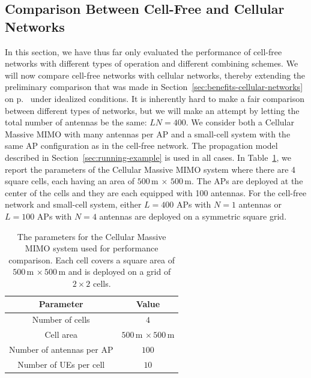 \enlargethispage{\baselineskip}

\subsection{Comparison Between Cell-Free and Cellular Networks}

In this section, we have thus far only evaluated the performance of cell-free networks with different types of operation and different combining schemes. We will now compare cell-free networks with cellular networks, thereby extending the preliminary comparison that was made in Section~\ref{sec:benefits-cellular-networks} on p.~\pageref{sec:benefits-cellular-networks} under idealized conditions. It is inherently hard to make a fair comparison between different types of networks, but we will make an attempt by letting the total number of antennas be the same: $LN=400$. We consider both a Cellular Massive MIMO with many antennas per AP and a small-cell system with the same AP configuration as in the cell-free network.
The propagation model described in Section~\ref{sec:running-example} is used in all cases. In Table~\ref{tab:system_parameters_running_example_cellular}, we report the parameters of the Cellular Massive MIMO system where there are 4 square cells, each having an area of $500$\,m $\times$ $500$\,m. The APs are deployed at the center of the cells and they are each equipped with 100 antennas. For the cell-free network and small-cell system, either $L=400$ APs with $N=1$ antennas or $L=100$ APs with $N=4$ antennas are deployed on a symmetric square grid.

\begin{table}[t]
	\renewcommand{\arraystretch}{1.}
	\centering
	\begin{tabular}{|c|c|}
		\hline \bfseries $\!\!\!\!\!$ Parameter $\!\!\!\!\!$ & \bfseries Value\\
		\hline\hline
		
		Number of cells &  $4$ \\
		Cell area &  $500$\,m $ \times\,  500$\,m \\
		Number of antennas per AP  & $100$ \\
		Number of UEs per cell & $10$ \\
		
		\hline
	\end{tabular}
	\caption{The parameters for the Cellular Massive MIMO system used for performance comparison. Each cell covers a square area of $500$\,m $ \times\, 500$\,m and is deployed on a grid of $2 \times 2$ cells.}
	\label{tab:system_parameters_running_example_cellular}
\end{table}


